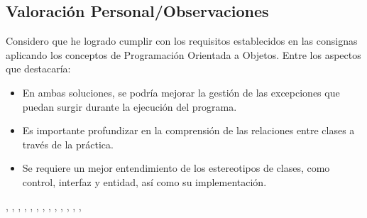 \documentclass[a4paper,12pt]{article}
\begin{document}
\subsection{Valoración Personal/Observaciones}

Considero que he logrado cumplir con los requisitos establecidos en las consignas aplicando los conceptos de Programación Orientada a Objetos. Entre los aspectos que destacaría:

\begin{itemize}
    \item En ambas soluciones, se podría mejorar la gestión de las excepciones que puedan surgir durante la ejecución del programa.
    \item Es importante profundizar en la comprensión de las relaciones entre clases a través de la práctica.
    \item Se requiere un mejor entendimiento de los estereotipos de clases, como control, interfaz y entidad, así como su implementación.
\end{itemize}

\cite{python-csv-doc}, \cite{realpython-csv}, \cite{miro-diagrama-uml}, \cite{upv-uml}, \cite{microsoft-fileio}, \cite{microsoft-readfile}, \cite{microsoft-commtimeouts}, \cite{microsoft-getcommtimeouts}, \cite{microsoft-setcommtimeouts}, \cite{geeksforgeeks-file-handling}, \cite{mygreatlearning-file-handling}, \cite{rmb1905-youtube}, \cite{rishabhpandey-youtube}, \cite{ratondbiblioteca-ebc}
\end{document}
